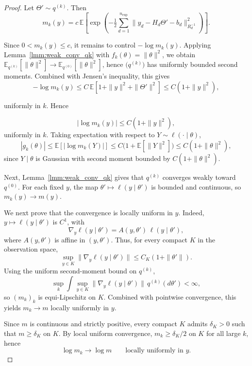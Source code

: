 \documentclass[a4paper,11pt]{article}
\newcommand{\E}{\mathbb{E}}
\begin{document}
\begin{proof}
Let \(\Theta'\sim q^{(k)}\). Then
\[
m_k(y)
=
c\,\E\!\left[
\exp\!\left(
-\tfrac12
\sum_{d=1}^{n_{\mathrm{exp}}}
\|y_d-H_d\Theta'-b_d\|_{R_d^{-1}}^2
\right)
\right].
\]

Since \(0<m_k(y)\le c\), it remains to control \(-\log m_k(y)\). Applying Lemma~\ref{lmm:weak_conv_qk} with \(f_k(\theta)=\|\theta\|^2\), we obtain \(\mathbb{E}_{q^{(k)}}[\|\theta\|^2]\to \mathbb{E}_{q^{(0)}}[\|\theta\|^2]\), hence \(\bigl(q^{(k)}\bigr)\) has uniformly bounded second moments. Combined with Jensen's inequality, this gives
\[
-\log m_k(y)
\le
C\,
\E\!\left[
1+\|y\|^2+\|\Theta'\|^2
\right]
\le
C(1+\|y\|^2),
\]

uniformly in \(k\). Hence

\begin{equation}\label{eq:quad_bound_mk}
|\log m_k(y)|\le C(1+\|y\|^2),
\end{equation}
uniformly in \(k\). Taking expectation with respect to \(Y\sim \ell(\cdot\mid\theta)\),
\[
|g_k(\theta)|
\le \E[|\log m_k(Y)|]
\le C\bigl(1+\E[\|Y\|^2]\bigr)
\le C(1+\|\theta\|^2),
\]
since \(Y\mid\theta\) is Gaussian with second moment bounded by \(C(1+\|\theta\|^2)\).

Next, Lemma~\ref{lmm:weak_conv_qk} gives that \(q^{(k)}\) converges weakly toward \(q^{(0)}\). For each fixed \(y\), the map
\(\theta'\mapsto \ell(y\mid\theta')\) is bounded and continuous, so
\(
m_k(y)\to m(y).
\)

We next prove that the convergence is locally uniform in \(y\). Indeed, \(y\mapsto \ell(y\mid\theta')\) is \(C^1\), with
\[
\nabla_y \ell(y\mid\theta')=A(y,\theta')\,\ell(y\mid\theta'),
\]
where \(A(y,\theta')\) is affine in \((y,\theta')\). Thus, for every compact \(K\) in the observation space,
\[
\sup_{y\in K}\|\nabla_y \ell(y\mid\theta')\|\le C_K(1+\|\theta'\|).
\]
Using the uniform second-moment bound on \(q^{(k)}\),
\[
\sup_k\int \sup_{y\in K}\|\nabla_y \ell(y\mid\theta')\|\,q^{(k)}(d\theta')<\infty,
\]
so \((m_k)_k\) is equi-Lipschitz on \(K\). Combined with pointwise convergence, this yields
\(m_k\to m\) locally uniformly in \(y\).

Since \(m\) is continuous and strictly positive, every compact \(K\) admits \(\delta_K>0\) such that
\(m\ge \delta_K\) on \(K\). By local uniform convergence, \(m_k\ge \delta_K/2\) on \(K\) for all large \(k\), hence
\[
\log m_k\to \log m
\qquad\text{locally uniformly in } y.
\]


\end{proof}
\end{document}
